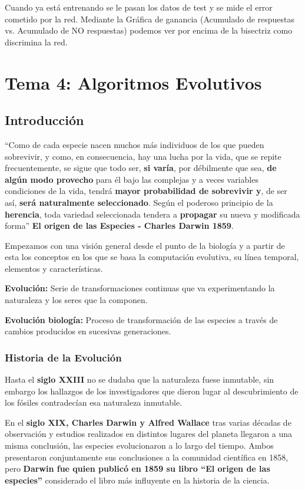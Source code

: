 \documentclass[12pt, twoside, openright]{report} %
\begin{document}
Cuando ya está entrenando se le pasan los datos de test y se mide el error cometido por la red. Mediante la Gráfica de ganancia (Acumulado de respuestas vs. Acumulado de NO respuestas) podemos ver por encima de la bisectriz como discrimina la red.

\chapter{Tema 4: Algoritmos Evolutivos}
\section{Introducción}
“Como de cada especie nacen muchos más individuos de los que pueden sobrevivir, y como, en consecuencia, hay una lucha por la vida, que se repite frecuentemente, se sigue que todo ser, \textbf{si varía}, por débilmente que sea, \textbf{de algún modo provecho} para él bajo las complejas y a veces variables condiciones de la vida, tendrá \textbf{mayor probabilidad de sobrevivir y}, de ser así, \textbf{será naturalmente seleccionado}. Según el poderoso principio de la \textbf{herencia}, toda variedad seleccionada tendera a \textbf{propagar} su nueva y modificada forma” \textbf{El origen de las Especies - Charles Darwin 1859}.

Empezamos con una visión general desde el punto de la biología y a partir de esta los conceptos en los que se basa la computación evolutiva, su línea temporal, elementos y características.

\textbf{Evolución:} Serie de transformaciones continuas que va experimentando la naturaleza y los seres que la componen.

\textbf{Evolución biología:} Proceso de transformación de las especies a través de cambios producidos en sucesivas generaciones.

\subsection{Historia de la Evolución}
Hasta el \textbf{siglo XXIII} no se dudaba que la naturaleza fuese inmutable, sin embargo los hallazgos de los investigadores que dieron lugar al descubrimiento de los fósiles contradecían esa naturaleza inmutable.

En el \textbf{siglo XIX, Charles Darwin y Alfred Wallace} tras varias décadas de observación y estudios realizados en distintos lugares del planeta llegaron a una misma conclusión, las especies evolucionaron a lo largo del tiempo. Ambos presentaron conjuntamente sus conclusiones a la comunidad científica en 1858, pero \textbf{Darwin fue quien publicó en 1859 su libro “El origen de las especies”} considerado el libro más influyente en la historia de la ciencia.
\end{document}
